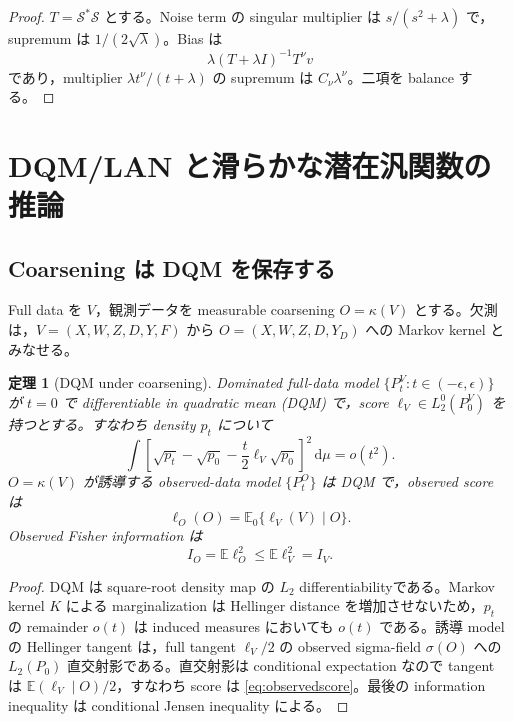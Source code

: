\documentclass[11pt,a4paper]{ltjsarticle}
\newtheorem{theorem}{定理}[section]
\theoremstyle{remark}
\newcommand{\E}{\mathbb E}
\newcommand{\dd}{\,\mathrm d}
\newcommand{\Sop}{\mathscr S}
\begin{document}
\begin{proof}
$T=\Sop^*\Sop$ とする。Noise term の singular multiplier は $s/(s^2+\lambda)$ で，supremum は $1/(2\sqrt\lambda)$。Bias は
\[
\lambda(T+\lambda I)^{-1}T^\nu v
\]
であり，multiplier $\lambda t^\nu/(t+\lambda)$ の supremum は $C_\nu\lambda^\nu$。二項を balance する。
\end{proof}

\section{DQM/LAN と滑らかな潜在汎関数の推論}\label{sec:dqminference}

\subsection{Coarsening は DQM を保存する}
Full data を $V$，観測データを measurable coarsening $O=\kappa(V)$ とする。欠測は，$V=(X,W,Z,D,Y,F)$ から $O=(X,W,Z,D,Y_D)$ への Markov kernel とみなせる。

\begin{theorem}[DQM under coarsening]\label{thm:dqmcoarsen}
Dominated full-data model $\{P_t^V:t\in(-\epsilon,\epsilon)\}$ が $t=0$ で differentiable in quadratic mean (DQM) で，score $\ell_V\in L_2^0(P_0^V)$ を持つとする。すなわち density $p_t$ について
\begin{equation}
\int\left[
\sqrt{p_t}-\sqrt{p_0}
-\frac t2\ell_V\sqrt{p_0}
\right]^2\dd\mu=o(t^2).
\label{eq:dqmfull}
\end{equation}
$O=\kappa(V)$ が誘導する observed-data model $\{P_t^O\}$ は DQM で，observed score は
\begin{equation}
\ell_O(O)=\E_0\{\ell_V(V)\mid O\}.
\label{eq:observedscore}
\end{equation}
Observed Fisher information は
\[
I_O=\E\ell_O^2\le\E\ell_V^2=I_V.
\]
\end{theorem}

\begin{proof}
DQM は square-root density map の $L_2$ differentiabilityである。Markov kernel $K$ による marginalization は Hellinger distance を増加させないため，$p_t$ の remainder $o(t)$ は induced measures においても $o(t)$ である。誘導 model の Hellinger tangent は，full tangent $\ell_V/2$ の observed sigma-field $\sigma(O)$ への $L_2(P_0)$ 直交射影である。直交射影は conditional expectation なので tangent は $\E(\ell_V\mid O)/2$，すなわち score は \eqref{eq:observedscore}。最後の information inequality は conditional Jensen inequality による。
\end{proof}
\end{document}
